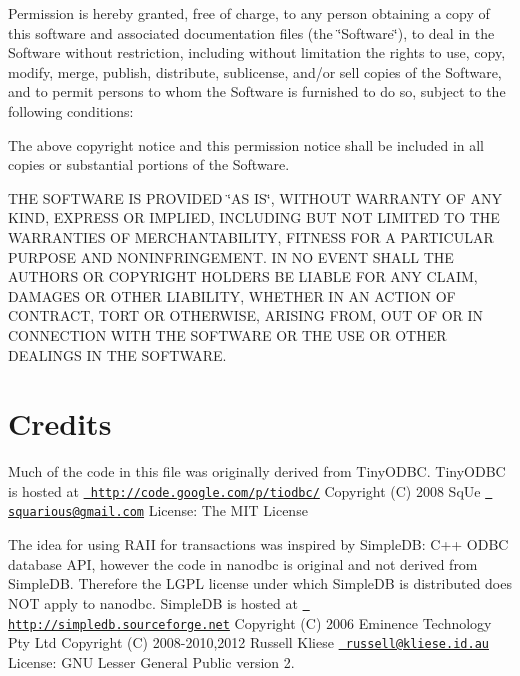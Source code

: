 Permission is hereby granted, free of charge, to any person obtaining a copy of this software and associated documentation files (the \char`\"{}\+Software\char`\"{}), to deal in the Software without restriction, including without limitation the rights to use, copy, modify, merge, publish, distribute, sublicense, and/or sell copies of the Software, and to permit persons to whom the Software is furnished to do so, subject to the following conditions\+:

The above copyright notice and this permission notice shall be included in all copies or substantial portions of the Software.

T\+HE S\+O\+F\+T\+W\+A\+RE IS P\+R\+O\+V\+I\+D\+ED \char`\"{}\+A\+S I\+S\char`\"{}, W\+I\+T\+H\+O\+UT W\+A\+R\+R\+A\+N\+TY OF A\+NY K\+I\+ND, E\+X\+P\+R\+E\+SS OR I\+M\+P\+L\+I\+ED, I\+N\+C\+L\+U\+D\+I\+NG B\+UT N\+OT L\+I\+M\+I\+T\+ED TO T\+HE W\+A\+R\+R\+A\+N\+T\+I\+ES OF M\+E\+R\+C\+H\+A\+N\+T\+A\+B\+I\+L\+I\+TY, F\+I\+T\+N\+E\+SS F\+OR A P\+A\+R\+T\+I\+C\+U\+L\+AR P\+U\+R\+P\+O\+SE A\+ND N\+O\+N\+I\+N\+F\+R\+I\+N\+G\+E\+M\+E\+NT. IN NO E\+V\+E\+NT S\+H\+A\+LL T\+HE A\+U\+T\+H\+O\+RS OR C\+O\+P\+Y\+R\+I\+G\+HT H\+O\+L\+D\+E\+RS BE L\+I\+A\+B\+LE F\+OR A\+NY C\+L\+A\+IM, D\+A\+M\+A\+G\+ES OR O\+T\+H\+ER L\+I\+A\+B\+I\+L\+I\+TY, W\+H\+E\+T\+H\+ER IN AN A\+C\+T\+I\+ON OF C\+O\+N\+T\+R\+A\+CT, T\+O\+RT OR O\+T\+H\+E\+R\+W\+I\+SE, A\+R\+I\+S\+I\+NG F\+R\+OM, O\+UT OF OR IN C\+O\+N\+N\+E\+C\+T\+I\+ON W\+I\+TH T\+HE S\+O\+F\+T\+W\+A\+RE OR T\+HE U\+SE OR O\+T\+H\+ER D\+E\+A\+L\+I\+N\+GS IN T\+HE S\+O\+F\+T\+W\+A\+RE. \hypertarget{index_credits}{}\section{Credits}\label{index_credits}
 Much of the code in this file was originally derived from Tiny\+O\+D\+BC. Tiny\+O\+D\+BC is hosted at \href{http://code.google.com/p/tiodbc/}{\texttt{ http\+://code.\+google.\+com/p/tiodbc/}} Copyright (C) 2008 Sq\+Ue \href{mailto:squarious@gmail.com}{\texttt{ squarious@gmail.\+com}} License\+: The M\+IT License

The idea for using R\+A\+II for transactions was inspired by Simple\+DB\+: C++ O\+D\+BC database A\+PI, however the code in nanodbc is original and not derived from Simple\+DB. Therefore the L\+G\+PL license under which Simple\+DB is distributed does N\+OT apply to nanodbc. Simple\+DB is hosted at \href{http://simpledb.sourceforge.net}{\texttt{ http\+://simpledb.\+sourceforge.\+net}} Copyright (C) 2006 Eminence Technology Pty Ltd Copyright (C) 2008-\/2010,2012 Russell Kliese \href{mailto:russell@kliese.id.au}{\texttt{ russell@kliese.\+id.\+au}} License\+: G\+NU Lesser General Public version 2.


